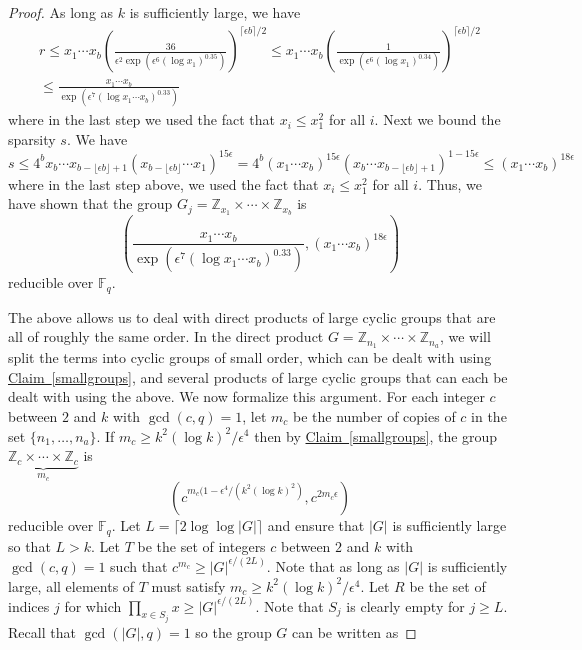 \documentclass[11pt]{article}
\numberwithin{equation}{section}
\theoremstyle{definition}
\theoremstyle{plain}
\newcommand{\Z}{\mathbb Z}
\newcommand{\expref}[2]{\hyperref[#2]{#1~\ref{#2}}}
\theoremstyle{definition}
\newcommand\F{{\mathbb{F}}}
\renewcommand\Z{{\mathbb{Z}}}
\begin{document}
\begin{proof}
As long as $k$ is sufficiently large, we have
%
\begin{eqnarray*}
r \leq x_1 \cdots x_b\left( \frac{36}{\epsilon^2 \exp\left(\epsilon^6 (\log x_1)^{0.35}\right)} \right)^{\lceil \epsilon b \rceil/2} \leq x_1 \cdots x_b\left( \frac{1}{\exp\left(\epsilon^6 (\log x_1)^{0.34}\right)} \right)^{\lceil \epsilon b \rceil/2}  \\ \leq \frac{ x_1 \cdots x_b}{\exp\left(\epsilon^7 (\log x_1 \cdots x_b )^{0.33}\right)}
\end{eqnarray*}
where in the last step we used the fact that $x_i \leq x_1^2$ for all $i$.  Next we bound the sparsity $s$.  We have
\[
s \leq 4^b x_b \cdots x_{b - \lfloor \epsilon b\rfloor + 1}(x_{b - \lfloor \epsilon b\rfloor} \cdots x_1)^{15\epsilon} = 4^b (x_1 \cdots x_b)^{15\epsilon}(x_b \cdots x_{b - \lfloor \epsilon b\rfloor + 1})^{1 - 15\epsilon} \leq (x_1 \cdots x_b)^{18\epsilon}
\]
where in the last step above, we used the fact that $x_i \leq x_1^2$ for all $i$.  Thus, we have shown that the group $G_j = \Z_{x_1} \times \cdots \times \Z_{x_b}$ is 
\[
\left( \frac{ x_1 \cdots x_b}{\exp\left(\epsilon^7 (\log x_1 \cdots x_b )^{0.33}\right)}, (x_1 \cdots x_b)^{18\epsilon}\right)
\]
reducible over $\F_q$.

The above allows us to deal with direct products of large cyclic groups that are all of roughly the same order.  In the direct product $G = \Z_{n_1} \times \cdots \times \Z_{n_a}$, we will split the terms into cyclic groups of small order, which can be dealt with using \expref{Claim}{smallgroups}, and several products of large cyclic groups that can each be dealt with using the above. We now formalize this argument.  For each integer $c$ between $2$ and $k$ with $\gcd(c,q) = 1$, let $m_c$ be the number of copies of $c$ in the set $\{n_1, \dots , n_a \}$.  If $m_c \geq k^2 (\log k)^2/\epsilon^4 $ then by \expref{Claim}{smallgroups}, the group $\underbrace{\Z_c \times \cdots \times \Z_c}_{m_c}$ is 
\[
\left( c^{m_c(1 - \epsilon^4/(k^2 (\log k)^2)}, c^{2m_c \epsilon} \right)
\]
reducible over $\F_q$.  Let $L = \lceil 2\log \log |G| \rceil$ and ensure that $|G|$ is sufficiently large so that $L > k$.  Let $T$ be the set of integers $c$ between $2$ and $k$ with $\gcd(c,q) = 1$ such that $c^{m_c} \geq |G|^{\epsilon/(2L)}$.  Note that as long as $|G|$ is sufficiently large, all elements of $T$ must satisfy $m_c \geq k^2 (\log k)^2/\epsilon^4 $.  Let $R$ be the set of indices $j$ for which $\prod_{x \in S_j}x \geq |G|^{\epsilon/(2L)}$.  Note that $S_j$ is clearly empty for $j \geq L$.  Recall that $\gcd(|G|,q) = 1$ so the group $G$ can be written as 


\end{proof}
\end{document}
